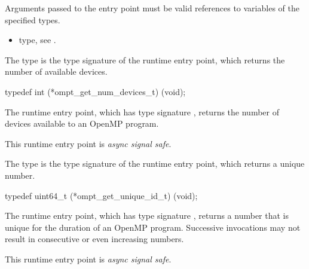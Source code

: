 \constraints
Arguments passed to the entry point must be valid references to variables 
of the specified types.

\crossreferences
\begin{itemize}
\item {} type, see .
\end{itemize}



\label{sec:ompt_get_num_devices_t}
\label{sec:ompt_get_num_devices}

\summary
The  type is the type signature of the 
 runtime entry point, which returns the
number of available devices.

\format
\begin{ccppspecific}
\begin{omptInquiry}
typedef int (*ompt_get_num_devices_t) (void);
\end{omptInquiry}
\end{ccppspecific}

\descr
The  runtime entry point, which has 
type signature , returns the number 
of devices available to an OpenMP program.

This runtime entry point is \emph{async signal safe}.



\label{sec:ompt_get_unique_id_t}
\label{sec:ompt_get_unique_id}

\summary
The  type is the type signature of the 
 runtime entry point, which returns a unique number.

\format
\begin{ccppspecific}
\begin{omptInquiry}
typedef uint64_t (*ompt_get_unique_id_t) (void);
\end{omptInquiry}
\end{ccppspecific}

\descr
The  runtime entry point, which has type 
signature , returns a number that is unique 
for the duration of an OpenMP program. Successive invocations may not 
result in consecutive or even increasing numbers.

This runtime entry point is \emph{async signal safe}.



